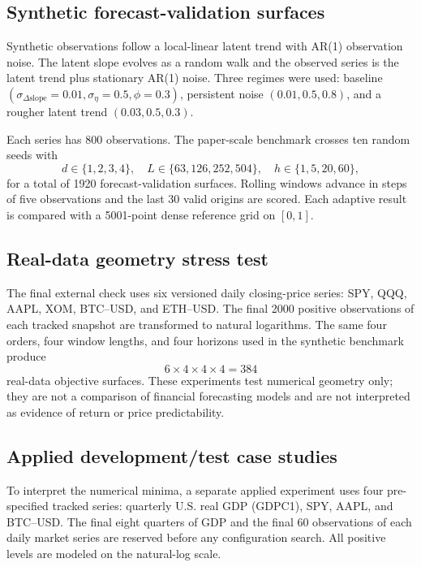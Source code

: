 \documentclass[english]{smcca}
\begin{document}
\subsection{Synthetic forecast-validation surfaces}

Synthetic observations follow a local-linear latent trend with AR(1) observation noise. The latent slope evolves as a random walk and the observed series is the latent trend plus stationary AR(1) noise. Three regimes were used: baseline \((\sigma_{\Delta\text{slope}}=0.01,\sigma_\eta=0.5,\phi=0.3)\), persistent noise \((0.01,0.5,0.8)\), and a rougher latent trend \((0.03,0.5,0.3)\).

Each series has 800 observations. The paper-scale benchmark crosses ten random seeds with
\[
d\in\{1,2,3,4\},\quad
L\in\{63,126,252,504\},\quad
h\in\{1,5,20,60\},
\]
for a total of 1920 forecast-validation surfaces. Rolling windows advance in steps of five observations and the last 30 valid origins are scored. Each adaptive result is compared with a 5001-point dense reference grid on \([0,1]\).

\subsection{Real-data geometry stress test}

The final external check uses six versioned daily closing-price series: SPY, QQQ, AAPL, XOM, BTC--USD, and ETH--USD. The final 2000 positive observations of each tracked snapshot are transformed to natural logarithms. The same four orders, four window lengths, and four horizons used in the synthetic benchmark produce
\[
6\times4\times4\times4=384
\]
real-data objective surfaces. These experiments test numerical geometry only; they are not a comparison of financial forecasting models and are not interpreted as evidence of return or price predictability.

\subsection{Applied development/test case studies}

To interpret the numerical minima, a separate applied experiment uses four
pre-specified tracked series: quarterly U.S. real GDP (GDPC1), SPY, AAPL, and
BTC--USD. The final eight quarters of GDP and the final 60 observations of each
daily market series are reserved before any configuration search. All positive
levels are modeled on the natural-log scale.
\end{document}

